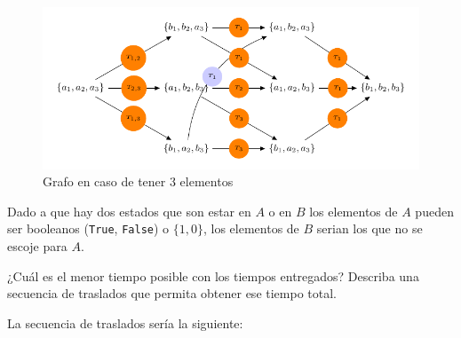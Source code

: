 \documentclass[letterpaper,10pt,table, dvipsnames]{article}
\begin{document}
\begin{figure}[h]
  \centering
  \includegraphics[scale=1]{pictures/modelgraph.pdf}
  \caption{Grafo en caso de tener 3 elementos}
  \label{fig:graphcomple}
\end{figure}

Dado a que hay dos estados que son estar en $A$ o en $B$ los elementos de $A$ pueden ser booleanos (\texttt{True}, \texttt{False}) o $\{1,0\}$, los elementos de $B$ serian los que no se escoje para $A$.

\newpage

\begin{tcolorbox}
 ¿Cuál es el menor tiempo posible con los tiempos entregados? Describa una secuencia de traslados que permita obtener ese tiempo total.
\end{tcolorbox}

La secuencia de traslados sería la siguiente: 
\end{document}

